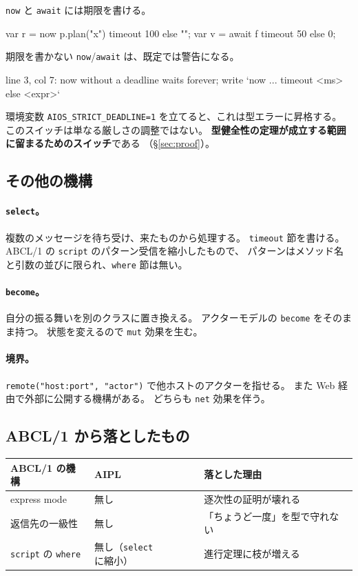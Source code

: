 \documentclass[11pt,a4paper]{ltjsarticle}
\theoremstyle{definition}
\theoremstyle{remark}
\begin{document}
\texttt{now} と \texttt{await} には期限を書ける。

\begin{aipl}
var r = now p.plan("x") timeout 100 else "";
var v = await f timeout 50 else 0;
\end{aipl}

期限を書かない \texttt{now}/\texttt{await} は、既定では警告になる。

\begin{term}
[warn] line 3, col 7: now without a deadline waits forever;
       write `now ... timeout <ms> else <expr>`
\end{term}

環境変数 \texttt{AIOS\_STRICT\_DEADLINE=1} を立てると、これは型エラーに昇格する。
このスイッチは単なる厳しさの調整ではない。
\textbf{型健全性の定理が成立する範囲に留まるためのスイッチ}である
（\S\ref{sec:proof}）。

\subsection{その他の機構}

\paragraph{\texttt{select}。}
複数のメッセージを待ち受け、来たものから処理する。
\texttt{timeout} 節を書ける。
ABCL/1 の \texttt{script} のパターン受信を縮小したもので、
パターンはメソッド名と引数の並びに限られ、\texttt{where} 節は無い。

\paragraph{\texttt{become}。}
自分の振る舞いを別のクラスに置き換える。
アクターモデルの \texttt{become} をそのまま持つ。
状態を変えるので \texttt{mut} 効果を生む。

\paragraph{境界。}
\texttt{remote("host:port", "actor")} で他ホストのアクターを指せる。
また Web 経由で外部に公開する機構がある。
どちらも \texttt{net} 効果を伴う。

\subsection{ABCL/1 から落としたもの}
\label{sec:dropped}

\begin{center}
\begin{tabular}{lll}
\toprule
ABCL/1 の機構 & AIPL & 落とした理由 \\
\midrule
express mode  & 無し & 逐次性の証明が壊れる \\
返信先の一級性 & 無し & 「ちょうど一度」を型で守れない \\
\texttt{script} の \texttt{where} & 無し（\texttt{select} に縮小） & 進行定理に枝が増える \\
\bottomrule
\end{tabular}
\end{center}
\end{document}
